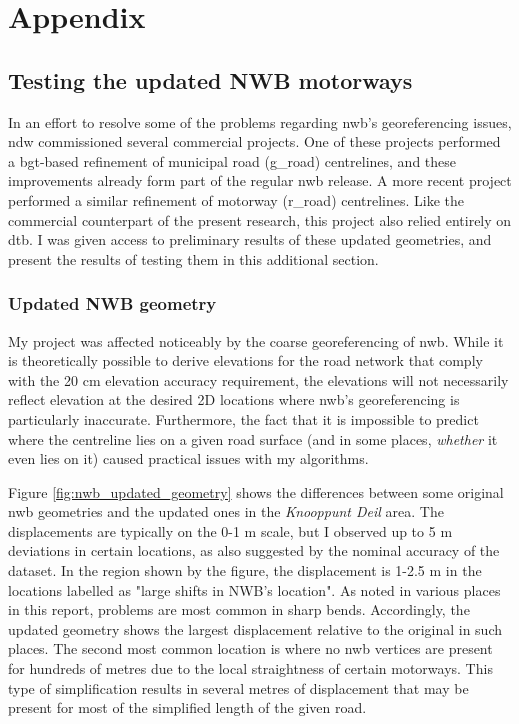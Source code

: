 
\chapter{Appendix}
\label{chap:app}

\section{Testing the updated NWB motorways}
\label{sec:nwb_updated}

In an effort to resolve some of the problems regarding \ac{nwb}'s georeferencing issues, \ac{ndw} commissioned several commercial projects. One of these projects performed a \ac{bgt}-based refinement of municipal road (\ac{g_road}) centrelines, and these improvements already form part of the regular \ac{nwb} release. A more recent project performed a similar refinement of motorway (\ac{r_road}) centrelines. Like the commercial counterpart of the present research, this project also relied entirely on \ac{dtb}. I was given access to preliminary results of these updated geometries, and present the results of testing them in this additional section.

\subsection{Updated NWB geometry}
\label{sub:nwb_updated_geometry}

My project was affected noticeably by the coarse georeferencing of \ac{nwb}. While it is theoretically possible to derive elevations for the road network that comply with the 20 cm elevation accuracy requirement, the elevations will not necessarily reflect elevation at the desired 2D locations where \ac{nwb}'s georeferencing is particularly inaccurate. Furthermore, the fact that it is impossible to predict where the centreline lies on a given road surface (and in some places, \textit{whether} it even lies on it) caused practical issues with my algorithms.

Figure \ref{fig:nwb_updated_geometry} shows the differences between some original \ac{nwb} geometries and the updated ones in the \textit{Knooppunt Deil} area. The displacements are typically on the 0-1 m scale, but I observed up to 5 m deviations in certain locations, as also suggested by the nominal accuracy of the dataset. In the region shown by the figure, the displacement is 1-2.5 m in the locations labelled as "large shifts in NWB's location". As noted in various places in this report, problems are most common in sharp bends. Accordingly, the updated geometry shows the largest displacement relative to the original in such places. The second most common location is where no \ac{nwb} vertices are present for hundreds of metres due to the local straightness of certain motorways. This type of simplification results in several metres of displacement that may be present for most of the simplified length of the given road.


